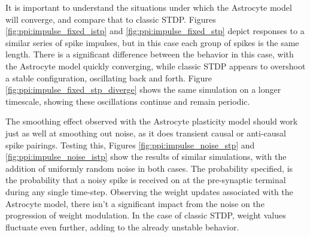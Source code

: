 

It is important to understand the situations under which the Astrocyte model
will converge, and compare that to classic STDP. Figures
\ref{fig:ppi:impulse_fixed_istp} and \ref{fig:ppi:impulse_fixed_stp} depict
responses to a similar series of spike impulses, but in this case each group of
spikes is the same length. There is a significant difference between the
behavior in this case, with the Astrocyte model quickly converging, while
classic STDP appears to overshoot a stable configuration, oscillating back and
forth. Figure \ref{fig:ppi:impulse_fixed_stp_diverge} shows the same simulation
on a longer timescale, showing these oscillations continue and remain periodic.




The smoothing effect observed with the Astrocyte plasticity model should work
just as well at smoothing out noise, as it does transient causal or anti-causal
spike pairings. Testing this, Figures \ref{fig:ppi:impulse_noise_stp} and
\ref{fig:ppi:impulse_noise_istp} show the results of similar simulations, with
the addition of uniformly random noise in both cases. The probability specified,
is the probability that a noisy spike is received on at the pre-synaptic
terminal during any single time-step. Observing the weight updates associated
with the Astrocyte model, there isn't a significant impact from the noise on the
progression of weight modulation. In the case of classic STDP, weight values
fluctuate even further, adding to the already unstable behavior.

